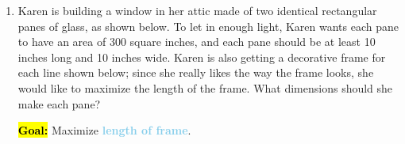 \documentclass{article}
\newcommand{\highlight}[1]{\boldmath\hl{\textbf{#1}}\unboldmath}
\newcommand{\goal}[1]{\textbf{\textcolor{skyblue}{#1}}}
\theoremstyle{theorem}
\begin{document}
\begin{enumerate}
  \pspace{\newpage}

\item {}  \finishexam 

  \begin{problem}
    Karen is building a window in her attic made of two identical rectangular panes of glass, as shown below. To let in enough light, Karen wants each pane to have an area of 300 square inches, and each pane should be at least 10 inches long and 10 inches wide. Karen is also getting a decorative frame for each line shown below; since she really likes the way the frame looks, she would like to maximize the length of the frame. What dimensions should she make each pane?
  \end{problem}

  \begin{problemonly}
  \end{problemonly}

  \pspace{\newpage}

  \begin{solution} 
    \highlight{Goal:} Maximize \goal{length of frame}.


\end{solution}
\end{enumerate}
\end{document}
